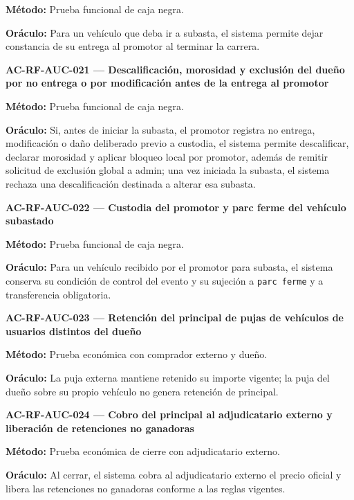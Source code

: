 \documentclass[10pt,letterpaper]{article}
\begin{document}
\textbf{Método:} Prueba funcional de caja negra.\par
\textbf{Oráculo:} Para un vehículo que deba ir a subasta, el sistema permite dejar constancia de su entrega al promotor al terminar la carrera.\par\vspace{0.45em}
\noindent\textbf{AC-RF-AUC-021 --- Descalificación, morosidad y exclusión del dueño por no entrega o por modificación antes de la entrega al promotor}\par
\textbf{Método:} Prueba funcional de caja negra.\par
\textbf{Oráculo:} Si, antes de iniciar la subasta, el promotor registra no entrega, modificación o daño deliberado previo a custodia, el sistema permite descalificar, declarar morosidad y aplicar bloqueo local por promotor, además de remitir solicitud de exclusión global a admin; una vez iniciada la subasta, el sistema rechaza una descalificación destinada a alterar esa subasta.\par\vspace{0.45em}
\noindent\textbf{AC-RF-AUC-022 --- Custodia del promotor y parc ferme del vehículo subastado}\par
\textbf{Método:} Prueba funcional de caja negra.\par
\textbf{Oráculo:} Para un vehículo recibido por el promotor para subasta, el sistema conserva su condición de control del evento y su sujeción a \texttt{parc ferme} y a transferencia obligatoria.\par\vspace{0.45em}
\noindent\textbf{AC-RF-AUC-023 --- Retención del principal de pujas de vehículos de usuarios distintos del dueño}\par
\textbf{Método:} Prueba económica con comprador externo y dueño.\par
\textbf{Oráculo:} La puja externa mantiene retenido su importe vigente; la puja del dueño sobre su propio vehículo no genera retención de principal.\par\vspace{0.45em}
\noindent\textbf{AC-RF-AUC-024 --- Cobro del principal al adjudicatario externo y liberación de retenciones no ganadoras}\par
\textbf{Método:} Prueba económica de cierre con adjudicatario externo.\par
\textbf{Oráculo:} Al cerrar, el sistema cobra al adjudicatario externo el precio oficial y libera las retenciones no ganadoras conforme a las reglas vigentes.\par\vspace{0.45em}
\end{document}
